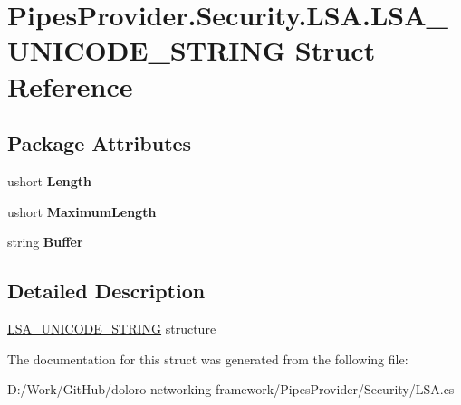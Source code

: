 \hypertarget{struct_pipes_provider_1_1_security_1_1_l_s_a_1_1_l_s_a___u_n_i_c_o_d_e___s_t_r_i_n_g}{}\section{Pipes\+Provider.\+Security.\+L\+S\+A.\+L\+S\+A\+\_\+\+U\+N\+I\+C\+O\+D\+E\+\_\+\+S\+T\+R\+I\+NG Struct Reference}
\label{struct_pipes_provider_1_1_security_1_1_l_s_a_1_1_l_s_a___u_n_i_c_o_d_e___s_t_r_i_n_g}
\subsection*{Package Attributes}
\begin{DoxyCompactItemize}
\item 
\mbox{\label{struct_pipes_provider_1_1_security_1_1_l_s_a_1_1_l_s_a___u_n_i_c_o_d_e___s_t_r_i_n_g_a47a8222b4f1eb7be1b842c0499c61dde}} 
ushort {\bfseries Length}
\item 
\mbox{\label{struct_pipes_provider_1_1_security_1_1_l_s_a_1_1_l_s_a___u_n_i_c_o_d_e___s_t_r_i_n_g_a7ab871d32b5cc7b523313d4b49ef24dd}} 
ushort {\bfseries Maximum\+Length}
\item 
\mbox{\label{struct_pipes_provider_1_1_security_1_1_l_s_a_1_1_l_s_a___u_n_i_c_o_d_e___s_t_r_i_n_g_ac1a1669b93a7749ef80d6508845233f9}} 
string {\bfseries Buffer}
\end{DoxyCompactItemize}


\subsection{Detailed Description}
\mbox{\hyperlink{struct_pipes_provider_1_1_security_1_1_l_s_a_1_1_l_s_a___u_n_i_c_o_d_e___s_t_r_i_n_g}{L\+S\+A\+\_\+\+U\+N\+I\+C\+O\+D\+E\+\_\+\+S\+T\+R\+I\+NG}} structure 

The documentation for this struct was generated from the following file\+:\begin{DoxyCompactItemize}
\item 
D\+:/\+Work/\+Git\+Hub/doloro-\/networking-\/framework/\+Pipes\+Provider/\+Security/L\+S\+A.\+cs\end{DoxyCompactItemize}
